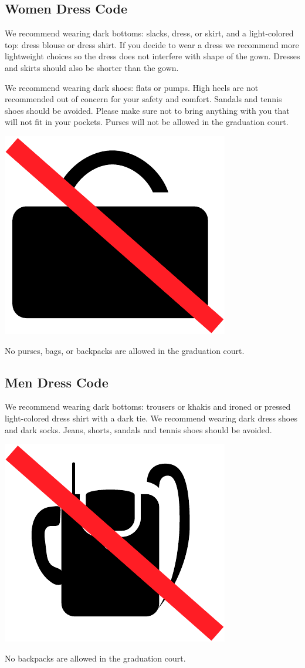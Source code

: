 \documentclass{tufte-handout}
\begin{document}
\subsection{Women Dress Code}
We recommend wearing dark bottoms: slacks, dress, or skirt, and a light-colored top: dress blouse or dress shirt. 
If you decide to wear a dress we recommend more lightweight choices so the dress does not interfere with shape of the gown. Dresses and skirts should also be shorter than the gown.

We recommend wearing dark shoes: flats or pumps. High heels are not recommended out of concern for your safety and comfort. Sandals and tennis shoes should be avoided. Please make sure not to bring anything with you that will not fit in your pockets. Purses will not be allowed in the graduation court.

\begin{marginfigure}[-12\baselineskip]%
\hspace*{0.02in}
  \includegraphics[width=.5\linewidth]{bag}
  \caption{\linespread{1.3}\selectfont{}No purses, bags, or backpacks are allowed in the graduation court.}
  \label{fig:bag}
\end{marginfigure}

\subsection{Men Dress Code}
We recommend wearing dark bottoms: trousers or khakis and ironed or pressed light-colored dress shirt with a dark tie. We recommend wearing dark dress shoes and dark socks. Jeans, shorts, sandals and tennis shoes should be avoided.

\begin{marginfigure}[-4\baselineskip]%
\hspace*{0.02in}
  \includegraphics[width=.5\linewidth]{backpack}
  \caption{\linespread{1.3}\selectfont{}No backpacks are allowed in the graduation court.}
  \label{fig:bag}
\end{marginfigure}
\end{document}
